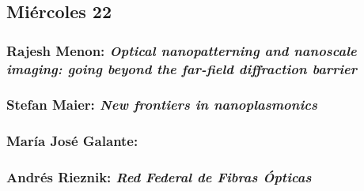 % 
% 
% 
% 
% 
% 
    
\subsection*{Mi\'ercoles 22}

\subsubsection*{Rajesh Menon: \textit{Optical nanopatterning and nanoscale imaging: going beyond the far-field diffraction barrier}}

\subsubsection*{Stefan Maier: \textit{New frontiers in nanoplasmonics}}

\subsubsection*{Mar\'ia Jos\'e Galante: }

\subsubsection*{Andr\'es Rieznik: \textit{Red Federal de Fibras \'Opticas}}

